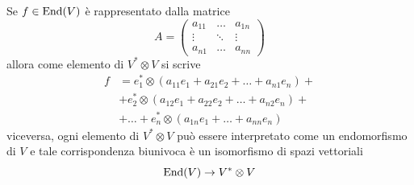 \documentclass[../main.tex]{subfiles}
\begin{document}
Se $f \in \operatorname{End}(V)$ è rappresentato dalla matrice
\begin{equation*}
    A = \begin{pmatrix}
        a_{11} & \ldots & a_{1n} \\
        \vdots & \ddots & \vdots \\
        a_{n1} & \ldots & a_{nn}
    \end{pmatrix}
\end{equation*}
allora come elemento di $V^* \otimes V$ si scrive
\begin{align*}
    f & = e_1^* \otimes (a_{11}e_1 + a_{21}e_2 + \ldots + a_{n1}e_n) + \\
      & + e_2^* \otimes (a_{12}e_1 + a_{22}e_2 + \ldots + a_{n2}e_n) + \\
      & + \ldots + e_n^* \otimes (a_{1n}e_1 + \ldots + a_{nn}e_n)
\end{align*}
viceversa, ogni elemento di $V^* \otimes V$ può essere interpretato come un endomorfismo di $V$ e tale corrispondenza biunivoca è un isomorfismo di spazi vettoriali
\begin{equation*}
    \operatorname{End}(V) \rightarrow V^* \otimes V
\end{equation*}
\end{document}
